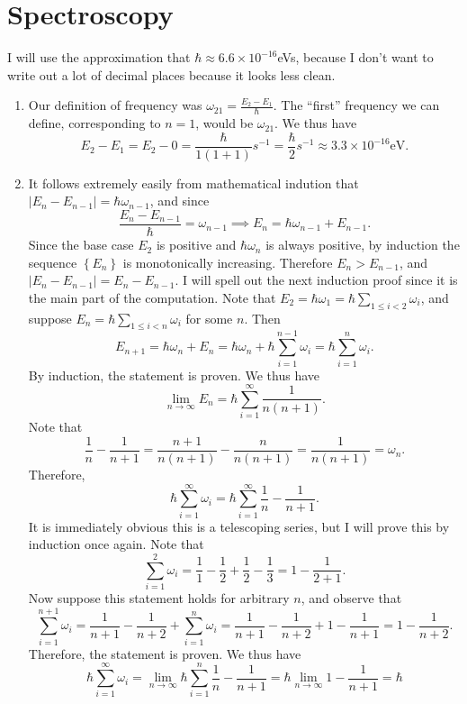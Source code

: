 \documentclass[11pt, letterpaper]{article}
\begin{document}
\section{Spectroscopy}
I will use the approximation that $\hbar \approx 6.6\times 10^{-16} $eVs, because I don't want to write out a lot of decimal places because it looks less clean.
\begin{enumerate}
	\item Our definition of frequency was $\omega_{21} =\frac{E_2-E_1}{\hbar } $. The ``first'' frequency we can define, corresponding to $n=1$, would be $\omega_{21} $. We thus have
		\[
			E_2-E_1=E_2-0=\frac{\hbar }{1(1+1)} s ^{-1} =\frac{\hbar }{2} s ^{-1} \approx 3.3\times 10^{-16} \text{eV}
		.\]
	\item It follows extremely easily from mathematical indution that $\left| E_n-E_{n-1}  \right| =\hbar \omega_{n-1} $, and since
		\[
			\frac{E_n-E_{n-1} }{\hbar } =\omega_{n-1} \implies E_n=\hbar \omega_{n-1} +E_{n-1} 
		.\]
		Since the base case $E_2$ is positive and $\hbar \omega_n$ is always positive, by induction the sequence $\left\{ E_n \right\} $ is monotonically increasing. Therefore $E_n>E_{n-1} $, and $\left| E_n-E_{n-1}  \right| =E_n-E_{n-1} $. I will spell out the next induction proof since it is the main part of the computation. Note that $E_2=\hbar \omega _1=\hbar \sum_{1\leq i<2} \omega_i$, and suppose $E_n=\hbar \sum_{1\leq i<n} \omega_i$ for some $n$. Then
		\[
			E_{n+1} =\hbar \omega_n+E_n=\hbar \omega_n+\hbar \sum_{i=1}^{n-1} \omega_i=\hbar \sum_{i=1}^{n} \omega_i
		.\]
		By induction, the statement is proven. We thus have
		\[
			\lim_{n \to \infty} E_n=\hbar \sum_{i=1}^{\infty} \frac{1}{n(n+1)} 
		.\]
		Note that
		\[
			\frac{1}{n} -\frac{1}{n+1} =\frac{n+1}{n(n+1)} -\frac{n}{n(n+1)} =\frac{1}{n(n+1)} =\omega_n
		.\]
		Therefore,
		\[
			\hbar \sum_{i=1}^{\infty} \omega _i=\hbar \sum_{i=1}^{\infty} \frac{1}{n} -\frac{1}{n+1} 
		.\]
		It is immediately obvious this is a telescoping series, but I will prove this by induction once again. Note that
		\[
			\sum_{i=1}^{2} \omega_i=\frac{1}{1} -\frac{1}{2} +\frac{1}{2} -\frac{1}{3} =1-\frac{1}{2+1} 
		.\]
		Now suppose this statement holds for arbitrary $n$, and observe that
		\[
			\sum_{i=1}^{n+1} \omega_i=\frac{1}{n+1} -\frac{1}{n+2} +\sum_{i=1}^{n} \omega _i=\frac{1}{n+1} -\frac{1}{n+2} +1-\frac{1}{n+1} =1-\frac{1}{n+2} 
		.\]
		Therefore, the statement is proven. We thus have
		\[
			\hbar \sum_{i=1}^{\infty} \omega_i=\lim_{n \to \infty} \hbar \sum_{i=1}^{n} \frac{1}{n} -\frac{1}{n+1} =\hbar \lim_{n \to \infty} 1-\frac{1}{n+1} =\hbar 
\]
\end{enumerate}
\end{document}
